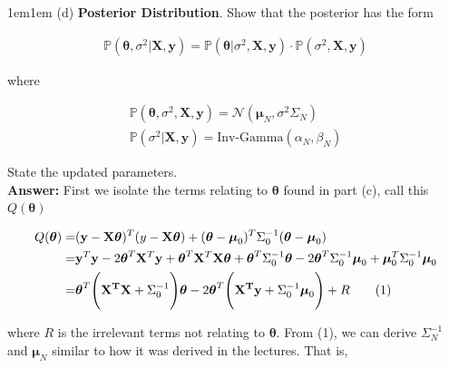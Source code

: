 \documentclass[11pt]{article}
\newcommand\numberthis{\addtocounter{equation}{1}\tag{\theequation}}
\begin{document}
\begin{adjustwidth}{1em}{1em}
        (d) \textbf{Posterior Distribution}. Show that the posterior has the form 

        \begin{align*}
            \mathbb{P}(\boldsymbol{\theta}, \sigma^2 | \mathbf{X, y}) =
            \mathbb{P}(\boldsymbol{\theta} | \sigma^2, \mathbf{X, y}) \cdot \mathbb{P}(\sigma^2,
            \mathbf{X,y})
        \end{align*}

        where 

        \begin{align*}
            \mathbb{P}(\boldsymbol{\theta}, \sigma^2, \mathbf{X,y}) =
            \mathcal{N}(\boldsymbol{\mu}_N, \sigma^2 \Sigma_N) \\ 
            \mathbb{P}(\sigma^2 | \mathbf{X,y}) = \text{Inv-Gamma}(\alpha_N, \beta_N)
        \end{align*}

        State the updated parameters. \\ 
        
        \textbf{Answer:} First we isolate the terms relating to $\boldsymbol{\theta}$ found in part
        (c), call this $Q(\boldsymbol{\theta})$

        \begin{align*}
            Q(\boldsymbol{\theta}) 
            =& (\mathbf{y} - \mathbf{X}\boldsymbol{\theta})^T(y -
            \mathbf{X}\boldsymbol{\theta}) + (\boldsymbol{\theta} - \boldsymbol{\mu}_0)^T
            \Sigma_0^{-1}(\boldsymbol{\theta} - \boldsymbol{\mu}_0) \\ 
            =& \mathbf{y}^T\mathbf{y} - 2\boldsymbol{\theta}^T \mathbf{X}^T \mathbf{y} +
            \boldsymbol{\theta}^T \mathbf{X}^T \mathbf{X} \boldsymbol{\theta} +
            \boldsymbol{\theta}^T \Sigma_0^{-1} \boldsymbol{\theta} - 2\boldsymbol{\theta}^T
            \Sigma_0^{-1}\boldsymbol{\mu}_0 + \boldsymbol{\mu}_0^T \Sigma_0^{-1}\boldsymbol{\mu}_0
            \\ 
            =& \boldsymbol{\theta}^T \Bigg(\mathbf{X^TX} + \Sigma_0^{-1}\Bigg)\boldsymbol{\theta} -
            2\boldsymbol{\theta}^T \Bigg(\mathbf{X^Ty} + \Sigma_0^{-1}\boldsymbol{\mu}_0\Bigg) + R
            \numberthis
        \end{align*}

        where $R$ is the irrelevant terms not relating to $\boldsymbol{\theta}$. From (1), we can
        derive $\Sigma_N^{-1}$ and $\boldsymbol{\mu}_N$ similar to how it was derived in the
        lectures. That is, 


\end{adjustwidth}
\end{document}
